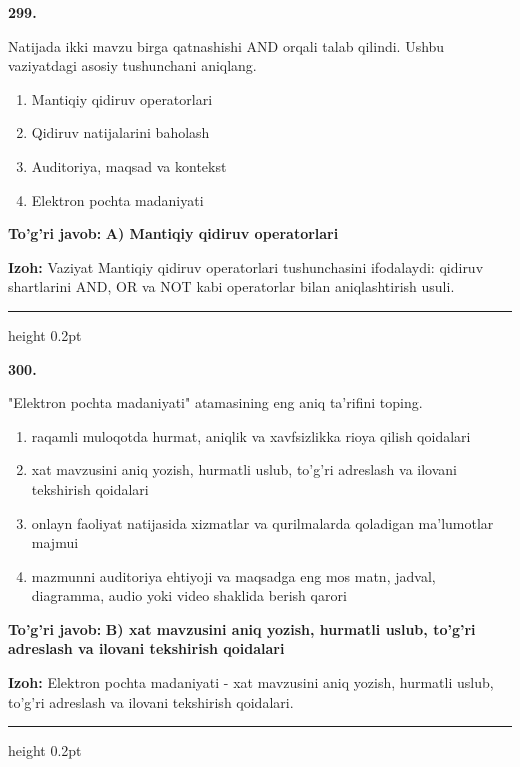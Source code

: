\documentclass[10pt,a4paper,oneside]{article}
\begin{document}
\noindent\textbf{\color{ink}299.}
\par
Natijada ikki mavzu birga qatnashishi AND orqali talab qilindi. Ushbu vaziyatdagi asosiy tushunchani aniqlang.
\begin{enumerate}[label=\Alph*),leftmargin=9mm]
\item Mantiqiy qidiruv operatorlari
\item Qidiruv natijalarini baholash
\item Auditoriya, maqsad va kontekst
\item Elektron pochta madaniyati
\end{enumerate}
\begin{tcolorbox}[enhanced,breakable,colback=teal!4,colframe=teal!50!black,boxrule=0.5pt,arc=1.1mm,left=3mm,right=3mm,top=1.7mm,bottom=1.7mm,before skip=2mm,after skip=2mm]
\textbf{\color{teal}To'g'ri javob:} \textbf{A) Mantiqiy qidiruv operatorlari}
\par\smallskip
\textbf{Izoh:} Vaziyat Mantiqiy qidiruv operatorlari tushunchasini ifodalaydi: qidiruv shartlarini AND, OR va NOT kabi operatorlar bilan aniqlashtirish usuli.
\end{tcolorbox}
\vspace{2mm}\hrule height 0.2pt \vspace{3mm}

\noindent\textbf{\color{ink}300.}
\par
"Elektron pochta madaniyati" atamasining eng aniq ta'rifini toping.
\begin{enumerate}[label=\Alph*),leftmargin=9mm]
\item raqamli muloqotda hurmat, aniqlik va xavfsizlikka rioya qilish qoidalari
\item xat mavzusini aniq yozish, hurmatli uslub, to'g'ri adreslash va ilovani tekshirish qoidalari
\item onlayn faoliyat natijasida xizmatlar va qurilmalarda qoladigan ma'lumotlar majmui
\item mazmunni auditoriya ehtiyoji va maqsadga eng mos matn, jadval, diagramma, audio yoki video shaklida berish qarori
\end{enumerate}
\begin{tcolorbox}[enhanced,breakable,colback=teal!4,colframe=teal!50!black,boxrule=0.5pt,arc=1.1mm,left=3mm,right=3mm,top=1.7mm,bottom=1.7mm,before skip=2mm,after skip=2mm]
\textbf{\color{teal}To'g'ri javob:} \textbf{B) xat mavzusini aniq yozish, hurmatli uslub, to'g'ri adreslash va ilovani tekshirish qoidalari}
\par\smallskip
\textbf{Izoh:} Elektron pochta madaniyati - xat mavzusini aniq yozish, hurmatli uslub, to'g'ri adreslash va ilovani tekshirish qoidalari.
\end{tcolorbox}
\vspace{2mm}\hrule height 0.2pt \vspace{3mm}
\end{document}
